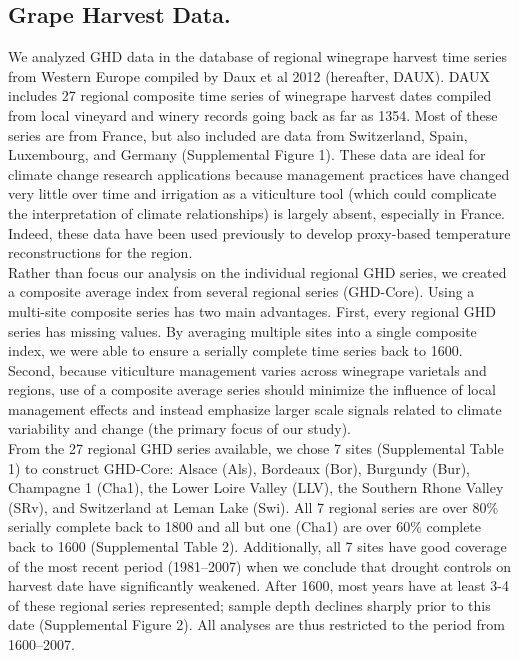 \documentclass[final]{nature}
\begin{document}
\begin{methods}
\subsection{Grape Harvest Data.}
\noindent We analyzed GHD data in the database of regional winegrape harvest time series from Western Europe compiled by Daux et al 2012 (hereafter, DAUX\cite{Daux2012}). DAUX includes 27 regional composite time series of winegrape harvest dates compiled from local vineyard and winery records going back as far as 1354. Most of these series are from France, but also included are data from Switzerland, Spain, Luxembourg, and Germany (Supplemental Figure 1). These data are ideal for climate change research applications because management practices have changed very little over time and irrigation as a viticulture tool (which could complicate the interpretation of climate relationships) is largely absent, especially in France. Indeed, these data have been used previously to develop proxy-based temperature reconstructions for the region\cite{Daux2012}.\\
\indent Rather than focus our analysis on the individual regional GHD series, we created a composite average index from several regional series (GHD-Core). Using a multi-site composite series has two main advantages. First, every regional GHD series has missing values. By averaging multiple sites into a single composite index, we were able to ensure a serially complete time series back to 1600. Second, because viticulture management varies across winegrape varietals and regions, use of a composite average series should minimize the influence of local management effects and instead emphasize larger scale signals related to climate variability and change (the primary focus of our study).\\
\indent From the 27 regional GHD series available, we chose 7 sites (Supplemental Table 1) to construct GHD-Core: Alsace (Als), Bordeaux (Bor), Burgundy (Bur), Champagne 1 (Cha1), the Lower Loire Valley (LLV), the Southern Rhone Valley (SRv), and Switzerland at Leman Lake (Swi). All 7 regional series are over 80\% serially complete back to 1800 and all but one (Cha1) are over 60\% complete back to 1600 (Supplemental Table 2). Additionally, all 7 sites have good coverage of the most recent period (1981--2007) when we conclude that drought controls on harvest date have significantly weakened. After 1600, most years have at least 3-4 of these regional series represented; sample depth declines sharply prior to this date (Supplemental Figure 2). All analyses are thus restricted to the period from 1600--2007.\\

\end{methods}
\end{document}
